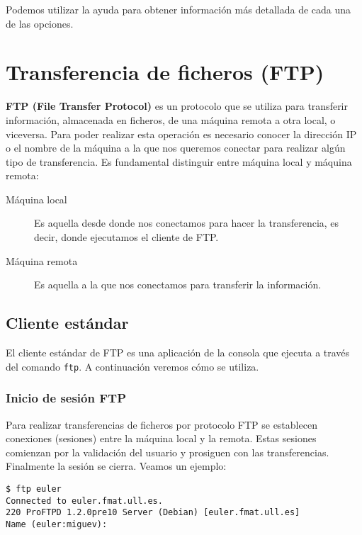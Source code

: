 Podemos utilizar  la ayuda para  obtener información más  detallada de
cada una de las opciones.

\section{Transferencia de ficheros (FTP)}

{\bf FTP (File Transfer Protocol)} es un protocolo que se utiliza para
transferir información, almacenada en  ficheros, de una máquina remota
a  otra local,  o viceversa.  Para  poder realizar  esta operación  es
necesario conocer la dirección  IP o el nombre de la  máquina a la que
nos queremos  conectar para realizar  algún tipo de  transferencia. Es
fundamental distinguir entre máquina local y máquina remota:

\begin{description}

\item[Máquina local] Es aquella desde  donde nos conectamos para hacer
la transferencia, es decir, donde ejecutamos el cliente de FTP.

\item[Máquina  remota]  Es  aquella  a  la  que  nos  conectamos  para
transferir la información.

\end{description}


\subsection{Cliente estándar}

El cliente estándar de FTP es una aplicación de la consola que ejecuta
a través del comando {\tt ftp}. A continuación veremos cómo
se utiliza.


\subsubsection{Inicio de sesión FTP}

Para  realizar  transferencias  de   ficheros  por  protocolo  FTP  se
establecen conexiones (sesiones)  entre la máquina local  y la remota.
Estas sesiones comienzan por la validación del usuario y prosiguen con
las transferencias. Finalmente la sesión se cierra. Veamos un ejemplo:

\begin{verbatim}
$ ftp euler
Connected to euler.fmat.ull.es.
220 ProFTPD 1.2.0pre10 Server (Debian) [euler.fmat.ull.es]
Name (euler:miguev): 
\end{verbatim}

